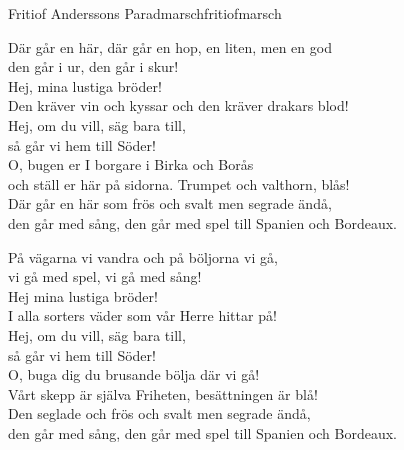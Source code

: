 \begin{song}{Fritiof Anderssons Paradmarsch}{fritiofmarsch}
\begin{vers}
Där går en här, där går en hop, en liten, men en god\\
den går i ur, den går i skur!\\
Hej, mina lustiga bröder!\\
Den kräver vin och kyssar och den kräver drakars blod!\\
Hej, om du vill, säg bara till,\\
så går vi hem till Söder!\\
O, bugen er I borgare i Birka och Borås\\
och ställ er här på sidorna. Trumpet och valthorn, blås!\\
Där går en här som frös och svalt men segrade ändå,\\
den går med sång, den går med spel till Spanien och Bordeaux.\\
\end{vers}
\begin{vers}
På vägarna vi vandra och på böljorna vi gå,\\
vi gå med spel, vi gå med sång!\\
Hej mina lustiga bröder!\\
I alla sorters väder som vår Herre hittar på!\\
Hej, om du vill, säg bara till,\\
så går vi hem till Söder!\\
O, buga dig du brusande bölja där vi gå!\\
Vårt skepp är själva Friheten, besättningen är blå!\\
Den seglade och frös och svalt men segrade ändå,\\
den går med sång, den går med spel till Spanien och Bordeaux.\\
\end{vers}
\end{song}

\newpage

